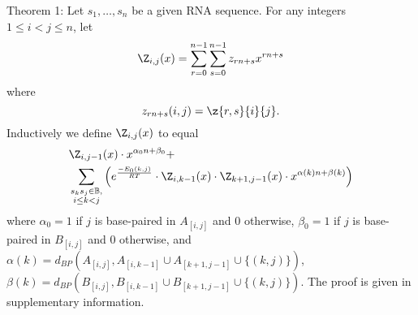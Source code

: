 \noindent
{\sc Theorem 1:} Let $s_1,\ldots,s_n$ be a given RNA sequence.
For any integers $1 \leq i < j \leq n$, let
\begin{eqnarray*}
\Z_{i,j}(x) = \sum_{r=0}^{n-1} \sum_{s=0}^{n-1} z_{rn+s}  x^{rn+s}
\end{eqnarray*}
where
\[
z_{rn+s}(i,j)= \z{r,s}{i}{j}.
\]
Inductively we define $\Z_{i,j}(x)$ to equal
\begin{eqnarray}
\label{eq:polynomialRecursionNussJac}
&\Z_{i,j-1}(x) \cdot x^{\alpha_0n+\beta_0} + \\
&\sum_{\substack{s_k s_j \in \mathbb{B},\\i\le k<j}}
\left(e^{\frac{-E_0(k,j)}{RT}}\cdot
\Z_{i,k-1}(x)\cdot\Z_{k+1,j-1}(x)\cdot x^{\alpha(k)n+\beta(k)} \right)
\nonumber
\end{eqnarray}
where $\alpha_0 = 1$ if $j$ is base-paired in $A_{[i,j]}$ and $0$ otherwise,
$\beta_0 = 1$ if $j$ is base-paired in $B_{[i,j]}$ and $0$ otherwise, and
$\alpha(k)=d_{BP}(A_{[i,j]}, A_{[i,k-1]} \cup A_{[k+1,j-1]} \cup\{(k,j)\})$,
$\beta(k)=d_{BP}(B_{[i,j]}, B_{[i,k-1]} \cup B_{[k+1,j-1]} \cup\{(k,j)\})$.
The proof is given in supplementary information.
\medskip

